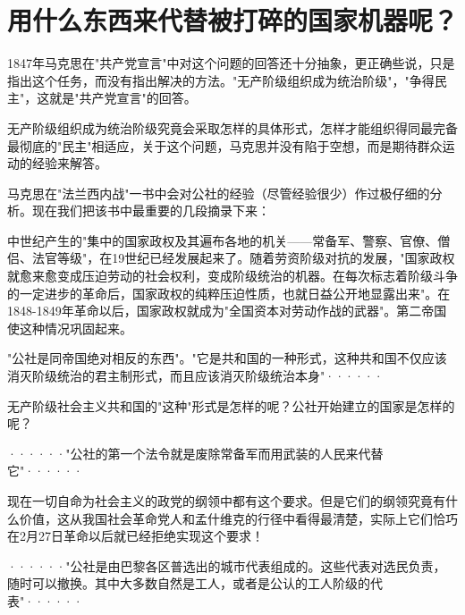 \chapter{用什么东西来代替被打碎的国家机器呢？} %

1847年马克思在"共产党宣言"中对这个问题的回答还十分抽象，更正确些说，只是指出这个任务，而没有指出解决的方法。"无产阶级组织成为统治阶级"，"争得民主"，这就是"共产党宣言"的回答。

无产阶级组织成为统治阶级究竟会采取怎样的具体形式，怎样才能组织得同最完备最彻底的"民主"相适应，关于这个问题，马克思并没有陷于空想，而是期待群众运动的{\kaishu 经验}来解答。

马克思在"法兰西内战"一书中会对公社的经验（尽管经验很少）作过极仔细的分析。现在我们把该书中最重要的几段摘录下来：

\pskip
\leftskip=10mm
\small

中世纪产生的"集中的国家政权及其遍布各地的机关——常备军、警察、官僚、僧侣、法官等级"，在19世纪已经发展起来了。随着劳资阶级对抗的发展，"国家政权就愈来愈变成压迫劳动的社会权利，变成阶级统治的机器。在每次标志着阶级斗争的一定进步的革命后，国家政权的纯粹压迫性质，也就日益公开地显露出来"。在1848-1849年革命以后，国家政权就成为"全国资本对劳动作战的武器"。第二帝国使这种情况巩固起来。

"公社是同帝国绝对相反的东西"。"它是共和国的一种形式，这种共和国不仅应该消灭阶级统治的君主制形式，而且应该消灭阶级统治本身"······

\normalsize
\leftskip=0mm
\pskip

无产阶级社会主义共和国的"这种"形式是怎样的呢？公社开始建立的国家是怎样的呢？

\pskip
\leftskip=10mm
\small

······"公社的第一个法令就是废除常备军而用武装的人民来代替它"······

\normalsize
\leftskip=0mm
\pskip

现在一切自命为社会主义的政党的纲领中都有这个要求。但是它们的纲领究竟有什么价值，这从我国社会革命党人和孟什维克的行径中看得最清楚，实际上它们恰巧在2月27日革命以后就已经拒绝实现这个要求！

\pskip
\leftskip=10mm
\small

······"公社是由巴黎各区普选出的城市代表组成的。这些代表对选民负责，随时可以撤换。其中大多数自然是工人，或者是公认的工人阶级的代表"······

